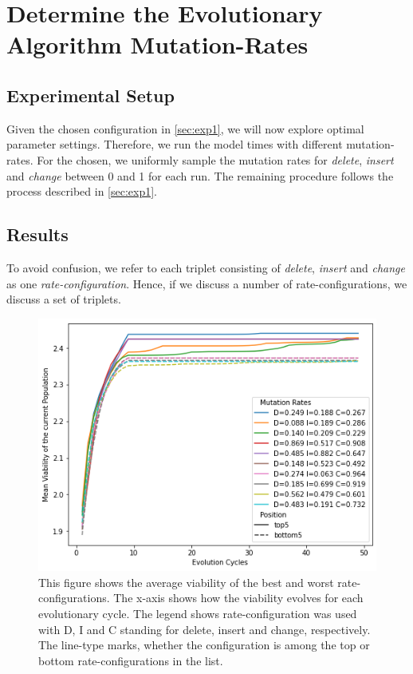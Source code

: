 \documentclass[./../../paper.tex]{subfiles}
\begin{document}
\section{Determine the Evolutionary Algorithm Mutation-Rates}

\subsection{Experimental Setup}
\label{sec:exp2}
Given the chosen configuration in \autoref{sec:exp1}, we will now explore optimal parameter settings. Therefore, we run the model  times with different mutation-rates. For the chosen, we uniformly sample the mutation rates for \emph{delete}, \emph{insert} and \emph{change} between 0 and 1 for each run. The remaining procedure follows the process described in \autoref{sec:exp1}.


\subsection{Results}
To avoid confusion, we refer to each triplet consisting of \emph{delete}, \emph{insert} and \emph{change} as one \emph{rate-configuration}. Hence, if we discuss a number of rate-configurations, we discuss a set of triplets.  

\begin{figure}[htbp]
    \centering
    \includegraphics[width=\textwidth]{figures/generated/exp2_effect_on_viability_top10_last10.png}
    \caption{This figure shows the average viability of the  best and worst rate-configurations. The x-axis shows how the viability evolves for each evolutionary cycle. The legend shows rate-configuration was used with D, I and C standing for delete, insert and change, respectively. The line-type marks, whether the configuration is among the top or bottom rate-configurations in the list.}
    \label{fig:average-mutation-rates}
\end{figure}
\end{document}
